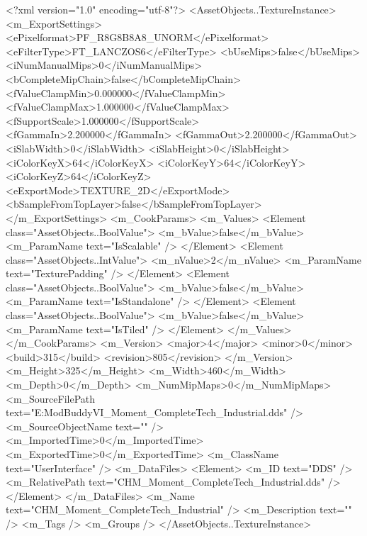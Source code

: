 ﻿<?xml version="1.0" encoding="utf-8"?>
<AssetObjects..TextureInstance>
  <m_ExportSettings>
    <ePixelformat>PF_R8G8B8A8_UNORM</ePixelformat>
    <eFilterType>FT_LANCZOS6</eFilterType>
    <bUseMips>false</bUseMips>
    <iNumManualMips>0</iNumManualMips>
    <bCompleteMipChain>false</bCompleteMipChain>
    <fValueClampMin>0.000000</fValueClampMin>
    <fValueClampMax>1.000000</fValueClampMax>
    <fSupportScale>1.000000</fSupportScale>
    <fGammaIn>2.200000</fGammaIn>
    <fGammaOut>2.200000</fGammaOut>
    <iSlabWidth>0</iSlabWidth>
    <iSlabHeight>0</iSlabHeight>
    <iColorKeyX>64</iColorKeyX>
    <iColorKeyY>64</iColorKeyY>
    <iColorKeyZ>64</iColorKeyZ>
    <eExportMode>TEXTURE_2D</eExportMode>
    <bSampleFromTopLayer>false</bSampleFromTopLayer>
  </m_ExportSettings>
  <m_CookParams>
    <m_Values>
      <Element class="AssetObjects..BoolValue">
        <m_bValue>false</m_bValue>
        <m_ParamName text="IsScalable" />
      </Element>
      <Element class="AssetObjects..IntValue">
        <m_nValue>2</m_nValue>
        <m_ParamName text="TexturePadding" />
      </Element>
      <Element class="AssetObjects..BoolValue">
        <m_bValue>false</m_bValue>
        <m_ParamName text="IsStandalone" />
      </Element>
      <Element class="AssetObjects..BoolValue">
        <m_bValue>false</m_bValue>
        <m_ParamName text="IsTiled" />
      </Element>
    </m_Values>
  </m_CookParams>
  <m_Version>
    <major>4</major>
    <minor>0</minor>
    <build>315</build>
    <revision>805</revision>
  </m_Version>
  <m_Height>325</m_Height>
  <m_Width>460</m_Width>
  <m_Depth>0</m_Depth>
  <m_NumMipMaps>0</m_NumMipMaps>
  <m_SourceFilePath text="E:\Documents\Firaxis ModBuddy\Civilization VI\ColoredHistoricMoments\ColoredHistoricMoments\Textures\CHM_Moment_CompleteTech_Industrial.dds" />
  <m_SourceObjectName text="" />
  <m_ImportedTime>0</m_ImportedTime>
  <m_ExportedTime>0</m_ExportedTime>
  <m_ClassName text="UserInterface" />
  <m_DataFiles>
    <Element>
      <m_ID text="DDS" />
      <m_RelativePath text="CHM_Moment_CompleteTech_Industrial.dds" />
    </Element>
  </m_DataFiles>
  <m_Name text="CHM_Moment_CompleteTech_Industrial" />
  <m_Description text="" />
  <m_Tags />
  <m_Groups />
</AssetObjects..TextureInstance>